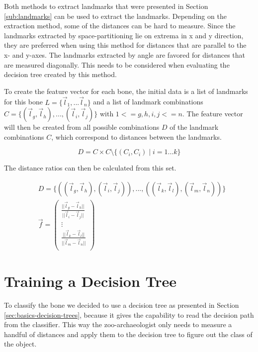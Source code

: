 \documentclass[pdftex,12pt,a4paper]{report}
\begin{document}
Both methods to extract landmarks that were presented in Section \ref{sub:landmarks} can be used to extract the landmarks. Depending on the extraction method, some of the distances can be hard to measure. Since the landmarks extracted by space-partitioning lie on extrema in x and y direction, they are preferred when using this method for distances that are parallel to the x- and y-axes. The landmarks extracted by angle are favored for distances that are measured diagonally. This needs to be considered when evaluating the decision tree created by this method.

To create the feature vector for each bone, the initial data is a list of landmarks for this bone $L = \{ \vec{l}_1, ... \vec{l}_n \}$ and a list of landmark combinations $C = \{ (\vec{l}_g, \vec{l}_h), ..., (\vec{l}_i, \vec{l}_j) \}$ with $1 <= g,h,i,j <= n$. The feature vector will then be created from all possible combinations $D$ of the landmark combinations $C$, which correspond to distances between the landmarks.

\begin{equation}
D = C \times C \setminus \{ (C_i, C_i) \mid i = 1 ... k \}
\end{equation}

The distance ratios can then be calculated from this set.

\begin{equation}
\begin{split}
& D = \{ ((\vec{l}_g, \vec{l}_h), (\vec{l}_i, \vec{l}_j)), ..., ((\vec{l}_k, \vec{l}_l), (\vec{l}_m, \vec{l}_n)) \} \\
& \vec{f} = \left( \begin{array}{c}
\frac{||\vec{l}_g - \vec{l}_h||}{||\vec{l}_i - \vec{l}_j||} \\
\vdots \\
\frac{||\vec{l}_k - \vec{l}_l||}{||\vec{l}_m - \vec{l}_n||} \\
\end{array} \right)
\end{split}
\end{equation}

\section{Training a Decision Tree}

To classify the bone we decided to use a decision tree as presented in Section \ref{sec:basics-decision-trees}, because it gives the capability to read the decision path from the classifier. This way the zoo-archaeologist only needs to measure a handful of distances and apply them to the decision tree to figure out the class of the object.
\end{document}

